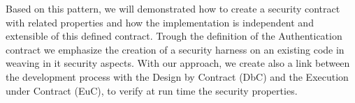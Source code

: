 Based on this pattern, we will demonstrated how to create a security contract with related properties and how the implementation is independent and extensible of this defined contract. Trough the definition of the Authentication contract we emphasize the creation of a security harness on an existing code in weaving in it security aspects.
With our approach, we create also a link between the development process with the Design by Contract (DbC) and the Execution under Contract (EuC), to verify at run time the security properties.















